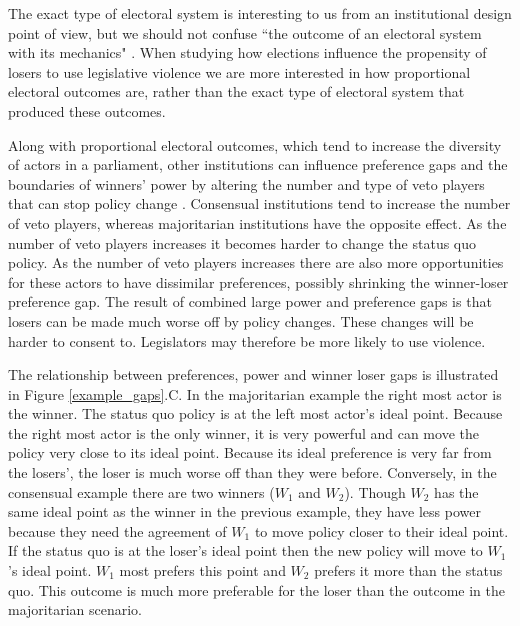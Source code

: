 \documentclass[a4paper]{article}\usepackage{graphicx, color}
\begin{document}
The exact type of electoral system is interesting to us from an institutional design point of view, but we should not confuse ``the outcome of an electoral system with its mechanics" \citep[][109]{Golder2005}. When studying how elections influence the propensity of losers to use legislative violence we are more interested in how proportional electoral outcomes are, rather than the exact type of electoral system that produced these outcomes. 

Along with proportional electoral outcomes, which tend to increase the diversity of actors in a parliament, other institutions can influence preference gaps and the boundaries of winners' power by altering the number and type of veto players that can stop policy change \citep{Tsebelis2002}. Consensual institutions tend to increase the number of veto players, whereas majoritarian institutions have the opposite effect. As the number of veto players increases it becomes harder to change the status quo policy. As the number of veto players increases there are also more opportunities for these actors to have dissimilar preferences, possibly shrinking the winner-loser preference gap. The result of combined large power and preference gaps is that losers can be made much worse off by policy changes. These changes will be harder to consent to. Legislators may therefore be more likely to use violence.

The relationship between preferences, power and winner loser gaps is illustrated in Figure \ref{example_gaps}.C. In the majoritarian example the right most actor is the winner. The status quo policy is at the left most actor's ideal point. Because the right most actor is the only winner, it is very powerful and can move the policy very close to its ideal point. Because its ideal preference is very far from the losers', the loser is much worse off than they were before. Conversely, in the consensual example there are two winners ($W_{1}$ and $W_{2}$). Though $W_{2}$ has the same ideal point as the winner in the previous example, they have less power because they need the agreement of $W_{1}$ to move policy closer to their ideal point. If the status quo is at the loser's ideal point then the new policy will move to $W_{1}$'s ideal point. $W_{1}$ most prefers this point and $W_{2}$ prefers it more than the status quo. This outcome is much more preferable for the loser than the outcome in the majoritarian  scenario.
\end{document}
